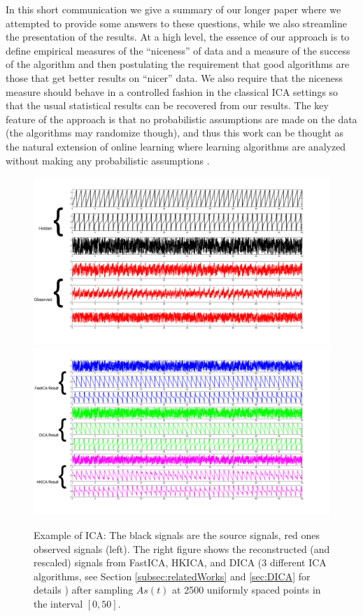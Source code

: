 \documentclass{article} %
\theoremstyle{definition}
\begin{document}
In this short communication we give a summary of our longer paper \citep{HuGySze15} where we attempted to provide some answers to these questions, while we also streamline the presentation of the results. 
At a high level, the essence of our approach is to define empirical measures of the ``niceness'' of data 
and a measure of the success of the algorithm and then postulating the requirement that good algorithms are those that get better results on ``nicer'' data. We also require that the niceness measure should behave in a controlled fashion in the classical
ICA settings so that the usual statistical results can be recovered from our results.
The key feature of the approach is that no probabilistic assumptions are made on the data (the algorithms may randomize though), and thus this work can be thought as the natural extension of online learning
where learning algorithms are analyzed without making any probabilistic assumptions \citep{CBLu06:book}.
\begin{figure}[h]
\centering
	\includegraphics[width = 0.49\linewidth]{demo_source}
	\includegraphics[width = 0.49\linewidth]{demo_res}
\caption{Example of ICA: The black signals are the source signals, red ones observed signals (left). The right figure shows the reconstructed (and rescaled) signals from FastICA, HKICA, and DICA (3 different ICA algorithms, see Section \ref{subsec:relatedWorks} and \ref{sec:DICA} for details ) after sampling $As(t)$ at 2500 uniformly spaced points in the interval $[0,50]$.}
\label{fig:demo}
\end{figure}
\end{document}
